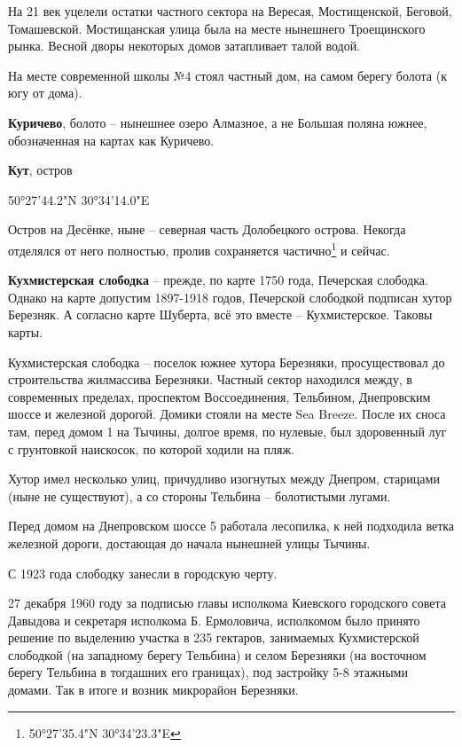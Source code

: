 На 21 век уцелели остатки частного сектора на Вересая, Мостищенской, Беговой, Томашевской. Мостищанская улица была на месте нынешнего Троещинского рынка. Весной дворы некоторых домов затапливает талой водой.

На месте современной школы №4 стоял частный дом, на самом берегу болота (к югу от дома).\\

\medskip


\textbf{Куричево}, болото – нынешнее озеро Алмазное, а не Большая поляна южнее, обозначенная на картах как Куричево.\\

\medskip


\textbf{Кут}, остров

50°27'44.2"N 30°34'14.0"E

Остров на Десёнке, ныне – северная часть Долобецкого острова. Некогда отделялся от него полностью, пролив сохраняется частично\footnote{50°27'35.4"N 30°34'23.3"E} и сейчас.\\

\medskip


\textbf{Кухмистерская слободка} – прежде, по карте 1750 года, Печерская слободка. Однако на карте допустим 1897-1918 годов, Печерской слободкой подписан хутор Березняк. А согласно карте Шуберта, всё это вместе – Кухмистерское. Таковы карты.

Кухмистерская слободка – поселок южнее хутора Березняки, просуществовал до строительства жилмассива Березняки. Частный сектор находился между, в современных пределах, проспектом Воссоединения, Тельбином, Днепровским шоссе и железной дорогой. Домики стояли на месте Sea Breeze. После их сноса там, перед домом 1 на Тычины, долгое время, по нулевые, был здоровенный луг с грунтовкой наискосок, по которой ходили на пляж.

Хутор имел несколько улиц, причудливо изогнутых между Днепром, старицами (ныне не существуют), а со стороны Тельбина – болотистыми лугами.

Перед домом на Днепровском шоссе 5 работала лесопилка, к ней подходила ветка железной дороги, достающая до начала нынешней улицы Тычины.

С 1923 года слободку занесли в городскую черту.

27 декабря 1960 году за подписью главы исполкома Киевского городского совета Давыдова и секретаря исполкома Б. Ермоловича, исполкомом было принято решение по выделению участка в 235 гектаров, занимаемых Кухмистерской слободкой (на западному берегу Тельбина) и селом Березняки (на восточном берегу Тельбина в тогдашних его границах), под застройку 5-8 этажными домами. Так в итоге и возник микрорайон Березняки. 

